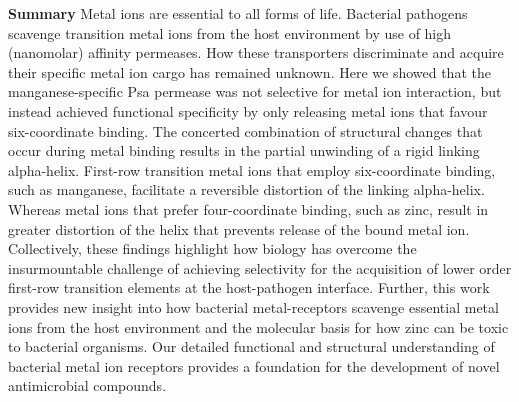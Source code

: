 \textbf{Summary}
Metal ions are essential to all forms of life. Bacterial pathogens scavenge transition metal ions from the host environment by use of high (nanomolar) affinity permeases. How these transporters discriminate and acquire their specific metal ion cargo has remained unknown. Here we showed that the manganese-specific Psa permease was not selective for metal ion interaction, but instead achieved functional specificity by only releasing metal ions that favour six-coordinate binding. The concerted combination of structural changes that occur during metal binding results in the partial unwinding of a rigid linking alpha-helix. First-row transition metal ions that employ six-coordinate binding, such as manganese, facilitate a reversible distortion of the linking alpha-helix. Whereas metal ions that prefer four-coordinate binding, such as zinc, result in greater distortion of the helix that prevents release of the bound metal ion. Collectively, these findings highlight how biology has overcome the insurmountable challenge of achieving selectivity for the acquisition of lower order first-row transition elements at the host-pathogen interface.  Further, this work provides new insight into how bacterial metal-receptors scavenge essential metal ions from the host environment and the molecular basis for how zinc can be toxic to bacterial organisms. Our detailed functional and structural understanding of bacterial metal ion receptors provides a foundation for the development of novel antimicrobial compounds. 
